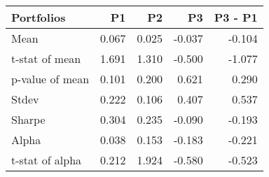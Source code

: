 \begin{tabular}{lrrrr}
\toprule
Portfolios & P1 & P2 & P3 & P3 - P1 \\
\midrule
Mean & 0.067 & 0.025 & -0.037 & -0.104 \\
t-stat of mean & 1.691 & 1.310 & -0.500 & -1.077 \\
p-value of mean & 0.101 & 0.200 & 0.621 & 0.290 \\
Stdev & 0.222 & 0.106 & 0.407 & 0.537 \\
Sharpe & 0.304 & 0.235 & -0.090 & -0.193 \\
Alpha & 0.038 & 0.153 & -0.183 & -0.221 \\
t-stat of alpha & 0.212 & 1.924 & -0.580 & -0.523 \\
\bottomrule
\end{tabular}
